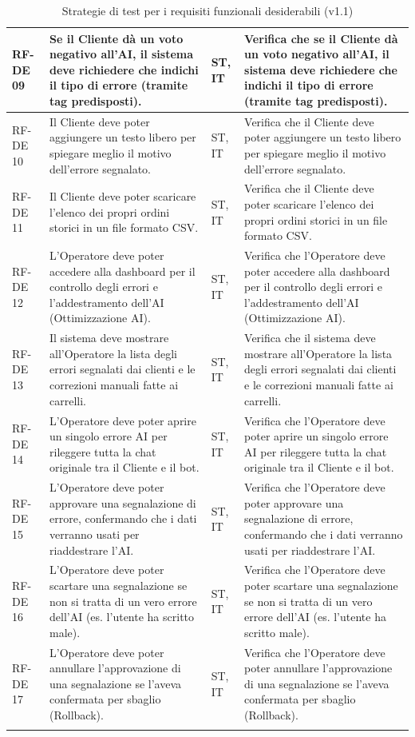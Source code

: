 \documentclass[a4paper,11pt,oneside]{scrartcl}
\begin{document}
\begin{longtable}{|p{1.5cm}|p{5.5cm}|p{1.8cm}|p{5cm}|}
RF-DE 09 & Se il Cliente dà un voto negativo all'AI, il sistema deve richiedere che indichi il tipo di errore (tramite tag predisposti). & ST, IT & Verifica che se il Cliente dà un voto negativo all'AI, il sistema deve richiedere che indichi il tipo di errore (tramite tag predisposti). \\ \hline
RF-DE 10 & Il Cliente deve poter aggiungere un testo libero per spiegare meglio il motivo dell'errore segnalato. & ST, IT & Verifica che il Cliente deve poter aggiungere un testo libero per spiegare meglio il motivo dell'errore segnalato. \\ \hline
RF-DE 11 & Il Cliente deve poter scaricare l'elenco dei propri ordini storici in un file formato CSV. & ST, IT & Verifica che il Cliente deve poter scaricare l'elenco dei propri ordini storici in un file formato CSV. \\ \hline
RF-DE 12 & L'Operatore deve poter accedere alla dashboard per il controllo degli errori e l'addestramento dell'AI (Ottimizzazione AI). & ST, IT & Verifica che l'Operatore deve poter accedere alla dashboard per il controllo degli errori e l'addestramento dell'AI (Ottimizzazione AI). \\ \hline
RF-DE 13 & Il sistema deve mostrare all'Operatore la lista degli errori segnalati dai clienti e le correzioni manuali fatte ai carrelli. & ST, IT & Verifica che il sistema deve mostrare all'Operatore la lista degli errori segnalati dai clienti e le correzioni manuali fatte ai carrelli. \\ \hline
RF-DE 14 & L'Operatore deve poter aprire un singolo errore AI per rileggere tutta la chat originale tra il Cliente e il bot. & ST, IT & Verifica che l'Operatore deve poter aprire un singolo errore AI per rileggere tutta la chat originale tra il Cliente e il bot. \\ \hline
RF-DE 15 & L'Operatore deve poter approvare una segnalazione di errore, confermando che i dati verranno usati per riaddestrare l'AI. & ST, IT & Verifica che l'Operatore deve poter approvare una segnalazione di errore, confermando che i dati verranno usati per riaddestrare l'AI. \\ \hline
RF-DE 16 & L'Operatore deve poter scartare una segnalazione se non si tratta di un vero errore dell'AI (es. l'utente ha scritto male). & ST, IT & Verifica che l'Operatore deve poter scartare una segnalazione se non si tratta di un vero errore dell'AI (es. l'utente ha scritto male). \\ \hline
RF-DE 17 & L'Operatore deve poter annullare l'approvazione di una segnalazione se l'aveva confermata per sbaglio (Rollback). & ST, IT & Verifica che l'Operatore deve poter annullare l'approvazione di una segnalazione se l'aveva confermata per sbaglio (Rollback). \\ \hline
\caption{Strategie di test per i requisiti funzionali desiderabili (v1.1)}
\end{longtable}
\end{document}
